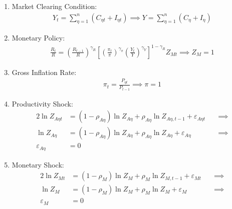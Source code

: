 \documentclass[
	thesis.tex
	]{subfiles}
\begin{document}
\begin{enumerate}
	\item Market Clearing Condition:
	\begin{align}
		Y_t = \sum_{\eta=1}^{n} (C_{\eta t} + I_{\eta t}) \implies Y = \sum_{\eta=1}^{n} (C_{\eta} + I_{\eta}) \label{eq:reg-ss-market-clearing-condition}
	\end{align}
	
	\item Monetary Policy:
	\begin{align}
		\label{eq:reg-ss-monetary-policy}
		\frac{R_t}{R} =
		\left( \frac{R_{t-1}}{R} \right)^{\gamma_R}  \left[
		\left( \frac{\pi_t}{\pi} \right)^{\gamma_\pi}
		\left( \frac{Y_t}{Y} \right)^{\gamma_Y} \right]^{1-\gamma_R} Z_{Mt}
		\implies Z_{M} = 1
	\end{align}
	
	\item Gross Inflation Rate:
	\begin{align}
		\label{eq:reg-ss-gross-inflation-rate}
		\pi_t = \frac{P_{\eta t}}{P_{t-1}} \implies \pi = 1
	\end{align}
	
	\item Productivity Shock:
	\begin{alignat}{2}
		\ln{Z_{A\eta t}} &= (1 -\rho_{A\eta}) \ln{Z_{A\eta}} + \rho_{A\eta} \ln{Z_{A\eta,t-1}} + \varepsilon_{A\eta t} \quad &\implies \nonumber \\
		\ln{Z_{A\eta}} &= (1 -\rho_{A\eta}) \ln{Z_{A\eta}} + \rho_{A\eta} \ln{Z_{A\eta}} + \varepsilon_{A\eta} &\implies \nonumber \\
		\varepsilon_{A\eta} &= 0 \label{eq:reg-ss-productivity-shock}
	\end{alignat}
	
	\item Monetary Shock:
	\begin{alignat}{2}
		\ln{Z_{Mt}} &= (1-\rho_M)\ln{Z_{M}} + \rho_M\ln{Z_{M,t-1}} + \varepsilon_{Mt} \quad &\implies \nonumber \\
		\ln{Z_{M}} &= (1-\rho_M)\ln{Z_{M}} + \rho_M\ln{Z_{M}} + \varepsilon_{M} &\implies \nonumber \\
		\varepsilon_{M} &= 0 \label{eq:reg-ss-monetary-shock}
	\end{alignat}
	
\end{enumerate}

\end{document}
